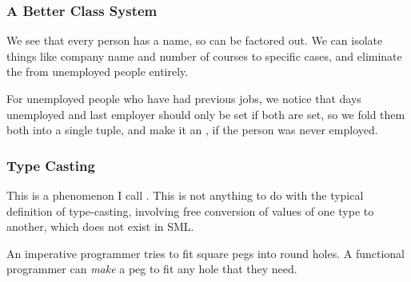 \documentclass[aspectratio=169, handout]{beamer}
\begin{document}
\begin{frame}[fragile]
  \frametitle{A Better Class System}

  We see that every person has a name, so  can be factored out. We
  can isolate things like company name and number of courses to specific cases,
  and eliminate the  from unemployed people entirely.

  \pause
  \vspace{\fill}

  For unemployed people who have had previous jobs, we notice that days unemployed and
  last employer should only be set if both are set, so we fold them both into a
  single tuple, and make it an , if the person was never employed.
\end{frame}

\begin{frame}[fragile]
  \frametitle{Type Casting}

  \tgs

  This is a phenomenon I call . This is not anything to do
  with the typical definition of type-casting, involving free conversion of
  values of one type to another, which does not exist in SML.

  \pause
  \vspace{\fill}


  \pause
  \vspace{\fill}

  An imperative programmer tries to fit square pegs into round holes. A
  functional programmer can \textit{make} a peg to fit any hole that they need.
\end{frame}



\thankyou
\end{document}
